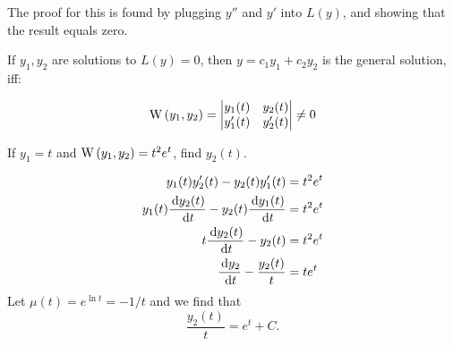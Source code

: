 The proof for this is found by plugging $y''$ and $y'$ into $L(y)$, and showing
that the result equals zero.

\begin{theorem}
    If $y_1, y_2$ are solutions to $L(y) = 0$, then $y=c_1y_1 + c_2 y_2$ is the
    general solution, iff:

    \begin{equation}
        \mathrm{W}\left(y_1, y_2\right) = 
        \begin{vmatrix}
            y_1(t)  & y_2(t) \\
            y_1'(t) & y_2'(t)
        \end{vmatrix}
        \neq 0
    \end{equation}
\end{theorem}

\begin{ex}
    If $y_1=t$ and $\mathrm{W}\left(y_1, y_2\right) = t^2 e^t$, find $y_2(t)$.
    \begin{sol}
        \begin{align*}
            y_1(t) y_2 ' (t) - y_2 (t) y_1'(t) &= t^2 e^t \\
            y_1(t)\frac{\,\mathrm{d} y_2 (t)}{\,\mathrm{d} t} - y_2(t) \frac{\,\mathrm{d} y_1(t)}{\,\mathrm{d} t} &= t^2 e^t \\
            t \frac{\,\mathrm{d} y_2(t)}{\,\mathrm{d} t} - y_2(t) &= t^2 e^t \\
            \frac{\,\mathrm{d} y_2}{\,\mathrm{d} t} - \frac{y_2(t)}{t} &= t e^t
        \end{align*}
        Let $\mu (t) = e^{\ln t} = - 1/t$ and we find that
        \[ \frac{y_2(t)}{t} = e^t + C. \]
    \end{sol}
\end{ex}
